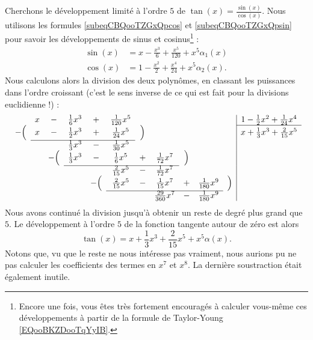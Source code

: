 \begin{example}
    Cherchons le développement limité à l'ordre \( 5\) de \( \tan(x)=\frac{ \sin(x) }{ \cos(x) }\). Nous utilisons les formules \eqref{subeqCBQooTZGxQpcos} et \eqref{subeqCBQooTZGxQpsin} pour savoir les développements de sinus et cosinus\footnote{Encore une fois, vous êtes très fortement encouragés à calculer vous-même ces développements à partir de la formule de Taylor-Young \ref{EQooBKZDooTqYyIB}.} :
    \begin{subequations}
        \begin{align}
            \sin(x)&=x-\frac{ x^3 }{ 6 }+\frac{ x^5 }{ 120 }+x^5\alpha_1(x)\\
            \cos(x)&=1-\frac{ x^2 }{ 2 }+\frac{ x^4 }{ 24 }+x^5\alpha_2(x).
        \end{align}
    \end{subequations}
    Nous calculons alors la division des deux polynômes, en classant les puissances dans l'ordre croissant (c'est le sens inverse de ce qui est fait pour la divisions euclidienne !) :
    \begin{equation*}
        \begin{array}[]{ccccccccccc|c}
            &x&-&\frac{1}{ 6 }x^3&+&\frac{1}{ 120 }x^5&&&&&&1-\frac{ 1 }{2}x^2+\frac{1}{ 24 }x^4\\
            \cline{12-12}
            -\Big( &x&-&\frac{ 1 }{2}x^3&+&\frac{1}{ 24 }x^5&\Big)& & && &x+\frac{1}{ 3 }x^3+\frac{ 2 }{ 15 }x^5\\
            \cline{2-6}
            & & &\frac{1}{ 3 }x^3&-&\frac{1}{ 30 }x^5& & & & && \\
            &&-\Big(  &\frac{1}{ 3 }x^3&-&\frac{1}{ 6 }x^5&+&\frac{1}{ 72 }x^7&\Big) & & \\
            \cline{4-8}
            & & & & &\frac{ 2 }{ 15 }x^5&-&\frac{1}{ 72 }x^7& & & \\
            & & &  &-\Big(  &\frac{ 2 }{ 15 }x^5&-&\frac{1}{ 15 }x^7&+&\frac{1}{ 180 }x^9&\Big)& \\
            \cline{6-10}
            & & & & & & &\frac{ 29 }{ 360 }x^7&-&\frac{1}{ 180 }x^9&& \\
        \end{array}
    \end{equation*}
    Nous avons continué la division jusqu'à obtenir un reste de degré plus grand que \( 5\). Le développement à l'ordre $5$ de la fonction tangente autour de zéro est alors
    \begin{equation}
        \tan(x)=x+\frac{1}{ 3 }x^3+\frac{ 2 }{ 15 }x^5+x^5\alpha(x).
    \end{equation}
    Notons que, vu que le reste ne nous intéresse pas vraiment, nous aurions pu ne pas calculer les coefficients des termes en \( x^7\) et \( x^8\). La dernière soustraction était également inutile.
\end{example}

